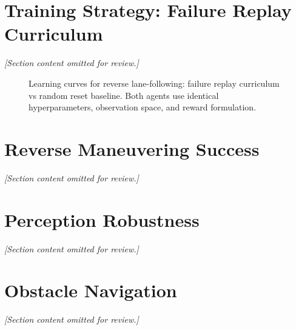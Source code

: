 \section{Training Strategy: Failure Replay Curriculum}
\textit{[Section content omitted for review.]}

\begin{figure}[H]
    \centering
    \caption{Learning curves for reverse lane-following: failure replay curriculum vs random
             reset baseline. Both agents use identical hyperparameters, observation space,
             and reward formulation.}
    \label{fig:failure_replay_curve}
\end{figure}

\begin{table}[H]
\centering
\caption{Failure replay curriculum ablation on reverse lane-following (lidar-24 obs, multiplicative reward, 30~held-out eval episodes).}
\label{tab:failure_replay}
\end{table}

\section{Reverse Maneuvering Success}
\textit{[Section content omitted for review.]}

\section{Perception Robustness}
\textit{[Section content omitted for review.]}

\section{Obstacle Navigation}
\label{sec:obstacle_results}
\textit{[Section content omitted for review.]}

\begin{table}[H]
\centering
\caption{Forward obstacle-avoidance: TD3 performance by observation space (dense reward, 5--10 obstacles per episode, 30~eval episodes).}
\label{tab:obstacle_forward}
\end{table}
\begin{table}[H]
\centering
\caption{Reverse obstacle-avoidance: TD3 performance by observation space (multiplicative reward, 5--10 obstacles per episode, 30~eval episodes).}
\label{tab:obstacle_reverse}
\end{table}

